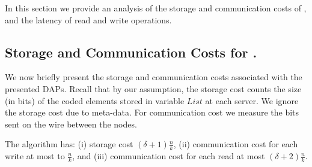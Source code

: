 In this section we provide an analysis of the storage and communication costs of \ares{}, 
and the latency of read and write operations. 

\subsection{Storage and Communication Costs for \ares{}.}\label{sec:safety:c}
We now briefly present the storage and communication costs associated with the presented DAPs.
Recall that by our assumption, the storage cost counts the size (in bits) of the coded elements 
stored in variable  $List$  at each server. We ignore the storage cost due to meta-data.
For  communication cost we measure the bits sent on the wire between the nodes.

\begin{theorem}\label{treas:performance}
 The \ares{} algorithm has: (i) storage cost $(\delta +1 )\frac{n}{k}$, (ii) communication 
cost for each write at most to $\frac{n}{k}$, and (iii) communication 
cost for each read at most $(\delta +2)\frac{n}{k}$.
\end{theorem}

